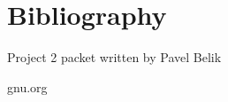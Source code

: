 \documentclass{amsart}
\numberwithin{equation}{section}
\begin{document}
\textbf{}
\begin{lstlisting}[language=octave]

\end{lstlisting}

\textbf{}
\begin{lstlisting}[language=octave]

\end{lstlisting}


\textbf{}
\begin{lstlisting}[language=octave]

\end{lstlisting}

\textbf{}
\begin{lstlisting}[language=octave]

\end{lstlisting}




\newpage
\section{Bibliography}
	Project 2 packet written by Pavel Belik \par
	gnu.org \par
	
\end{document}
